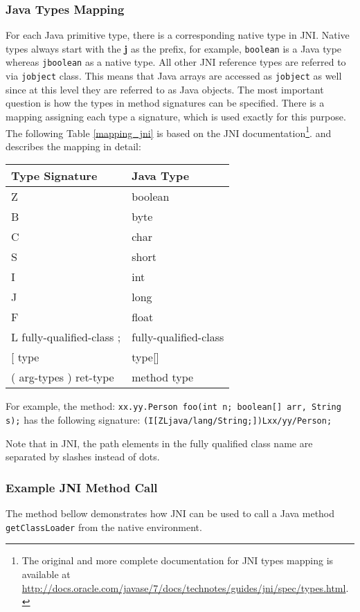 \subsubsection{Java Types Mapping}
For each Java primitive type, there is a corresponding native type in JNI. Native types always start with the \textbf{j} as the prefix, for example, \texttt{boolean} is a Java type whereas \texttt{jboolean} as a native type.
All other JNI reference types are referred to via \texttt{jobject} class. This means that Java arrays are accessed as \texttt{jobject} as well since at this level they are referred to as Java objects. The most important question is how the types in method signatures can be specified. There is a mapping assigning each type a signature, which is used exactly for this purpose. The following Table \ref{mapping_jni} is based on the JNI documentation\footnote{The original and more complete documentation for JNI types mapping is available at \url{http://docs.oracle.com/javase/7/docs/technotes/guides/jni/spec/types.html}.}. and describes the mapping in detail:
\begin{center}
\begin{tabular}{ l l }
	  \hline
	  Type Signature & Java Type \\ \hline
	Z & boolean \\
	B & byte \\
	C & char \\
	S & short \\
	I & int \\
	J & long \\
	F & float \\
	L fully-qualified-class ; & fully-qualified-class \\
	{[} type & type{[]}\ \\
	( arg-types ) ret-type & method type \\
\end{tabular}
\label{mapping_jni}
\end{center}

For example, the method: \newline \texttt{xx.yy.Person foo(int n; boolean[] arr, String s);} has the following signature:
\texttt{(I[ZLjava/lang/String;])Lxx/yy/Person;}

Note that in JNI, the path elements in the fully qualified class name are separated by slashes instead of dots.
\subsubsection{Example JNI Method Call}
The method bellow demonstrates how JNI can be used to call a Java method \texttt{getClassLoader} from the native environment.

